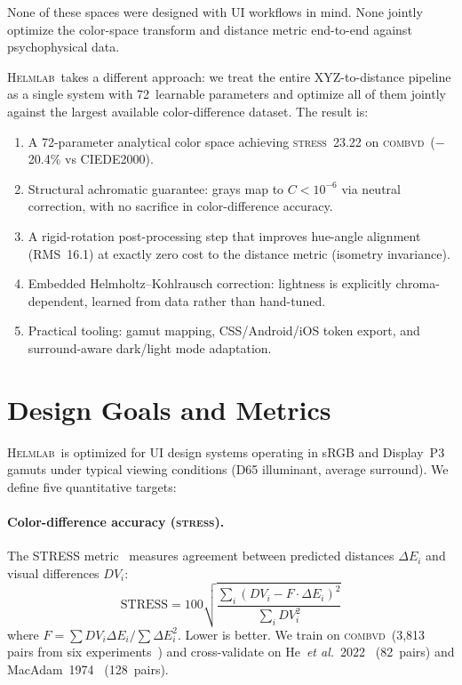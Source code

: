 \documentclass[11pt, twocolumn]{article}
\newcommand{\helmlab}{\textsc{Helmlab}}
\newcommand{\stress}{\textsc{stress}}
\newcommand{\combvd}{\textsc{combvd}}
\newcommand{\etal}{\textit{et al.}}
\begin{document}
None of these spaces were designed with UI workflows in mind. None
jointly optimize the color-space transform and distance metric
end-to-end against psychophysical data.

\helmlab\ takes a different approach: we treat the entire
XYZ-to-distance pipeline as a single system with 72~learnable
parameters and optimize all of them jointly against the largest
available color-difference dataset. The result is:

\begin{enumerate}
  \item A 72-parameter analytical color space achieving \stress\
    23.22 on \combvd\ ($-$20.4\% vs CIEDE2000).
  \item Structural achromatic guarantee: grays map to
    $C < 10^{-6}$ via neutral correction, with no sacrifice in
    color-difference accuracy.
  \item A rigid-rotation post-processing step that improves
    hue-angle alignment (RMS~16.1\textdegree) at exactly zero cost
    to the distance metric (isometry invariance).
  \item Embedded Helmholtz--Kohlrausch correction: lightness is
    explicitly chroma-dependent, learned from data rather than
    hand-tuned.
  \item Practical tooling: gamut mapping, CSS/Android/iOS token
    export, and surround-aware dark/light mode adaptation.
\end{enumerate}


\section{Design Goals and Metrics}
\label{sec:goals}

\helmlab\ is optimized for UI design systems operating in sRGB and
Display~P3 gamuts under typical viewing conditions (D65 illuminant,
average surround). We define five quantitative targets:

\paragraph{Color-difference accuracy (\stress).}
The STRESS metric~\cite{luo2006} measures agreement between predicted
distances $\Delta E_i$ and visual differences $DV_i$:
\begin{equation}
  \mathrm{STRESS} = 100\sqrt{\frac{\sum_i(DV_i - F \cdot \Delta E_i)^2}{\sum_i DV_i^2}}
  \label{eq:stress}
\end{equation}
where $F = \sum DV_i \Delta E_i / \sum \Delta E_i^2$. Lower is better.
We train on \combvd\ (3{,}813 pairs from six experiments~\cite{luo2006})
and cross-validate on He~\etal\ 2022~\cite{he2022} (82~pairs) and
MacAdam~1974~\cite{macadam1974} (128~pairs).
\end{document}
